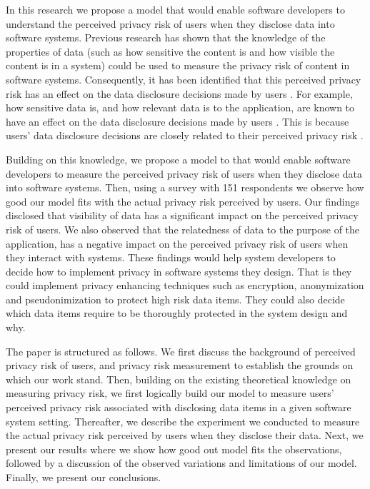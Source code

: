 \documentclass[10pt]{article}
\begin{document}
In this research we propose a model that would enable software developers to understand the perceived privacy risk of users when they disclose data into software systems. Previous research has shown that the knowledge of the properties of data (such as how sensitive the content is and how visible the content is in a system) could be used \cite {maximilien2009privacy} to measure the privacy risk of content in software systems. Consequently, it has been identified that this perceived privacy risk has an effect on the data disclosure decisions made by users \cite {malheiros2013fairly}. For example, how sensitive data is, and how relevant data is to the application, are known to have an effect on the data disclosure decisions made by users \cite {malheiros2013fairly}. This is because users' data disclosure decisions are closely related to their perceived privacy risk \cite {kobsa2007privacy, li2010understanding, malhotra2004internet}. 

Building on this knowledge, we propose a model to that would enable software developers to measure the perceived privacy risk of users when they disclose data into software systems. Then, using a survey with 151 respondents we observe how good our model fits with the actual privacy risk perceived by users. Our findings disclosed that visibility of data has a significant impact on the perceived privacy risk of users. We also observed that the relatedness of data to the purpose of the application, has a negative impact on the perceived privacy risk of users when they interact with systems. These findings would help system developers to decide how to implement privacy in software systems they design. That is they could implement privacy enhancing techniques such as encryption, anonymization and pseudonimization to protect high risk data items. They could also decide which data items require to be thoroughly protected in the system design and why.

The paper is structured as follows. We first discuss the background of perceived privacy risk of users, and privacy risk measurement to establish the grounds on which our work stand. Then, building on the existing theoretical knowledge on measuring privacy risk, we first logically build our model to measure users' perceived privacy risk associated with disclosing data items in a given software system setting. Thereafter, we describe the experiment we conducted to measure the actual privacy risk perceived by users when they disclose their data. Next, we present our results where we show how good out model fits the observations, followed by a discussion of the observed variations and limitations of our model. Finally, we present our conclusions.
\end{document}
